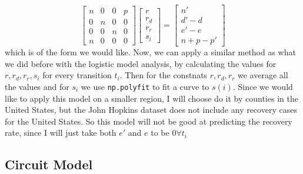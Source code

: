 \documentclass{report}
\begin{document}
                \begin{equation}
                    \begin{bmatrix}
                        n & 0 & 0 & p \\
                        0 & n & 0 & 0 \\
                        0 & 0 & n & 0 \\
                        n & 0 & 0 & 0
                    \end{bmatrix}\begin{bmatrix}
                        r \\
                        r_d \\
                        r_r \\
                        s_i
                    \end{bmatrix} = \begin{bmatrix}
                        n' \\
                        d' - d \\
                        e' - e \\
                        n + p - p'
                    \end{bmatrix}
                \end{equation}
                which is of the form we would like. Now, we can apply a similar method as what we did before with the logistic model analysis, by calculating the values for $r, r_d, r_r, s_i$ for every transition $t_i$. Then for the constnats $r, r_d, r_r$ we average all the values and for $s_i$ we use \lstinline{np.polyfit} to fit a curve to $s(i)$.
                \newline\indent
                Since we would like to apply this model on a smaller region, I will choose do it by counties in the United States, but the John Hopkins dataset does not include any recovery cases for the United States. So this model will not be good at predicting the recovery rate, since I will just take both $e'$ and $e$ to be $0 \forall t_i$
        \subsection{Circuit Model}
\end{document}
